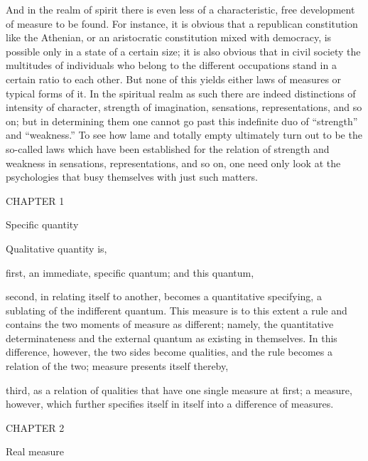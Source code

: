 And in the realm of spirit there is even less of a characteristic, free
development of measure to be found.
For instance, it is obvious that a
republican constitution like the Athenian, or an aristocratic constitution
mixed with democracy, is possible only in a state of a certain size;
it is also obvious that in civil society the multitudes of individuals
who belong to the different occupations stand in a certain ratio to each other.
But none of this yields either laws of measures or typical forms of it.
In the spiritual realm as such there are indeed distinctions of intensity of
character, strength of imagination, sensations, representations, and so on;
but in determining them one cannot go past this indefinite duo of
“strength” and “weakness.”
To see how lame and totally empty ultimately turn out to be
the so-called laws which have been established for
the relation of strength and weakness in sensations, representations,
and so on, one need only look at the psychologies
that busy themselves with just such matters.

CHAPTER 1

Specific quantity

Qualitative quantity is,

first, an immediate, specific quantum; and this quantum,

second, in relating itself to another,
becomes a quantitative specifying,
a sublating of the indifferent quantum.
This measure is to this extent a rule
and contains the two moments of measure as different;
namely, the quantitative determinateness
and the external quantum as existing in themselves.
In this difference, however, the two sides become qualities,
and the rule becomes a relation of the two; measure presents itself thereby,

third, as a relation of qualities that have one single measure at first;
a measure, however, which further specifies itself in itself into
a difference of measures.

CHAPTER 2

Real measure

